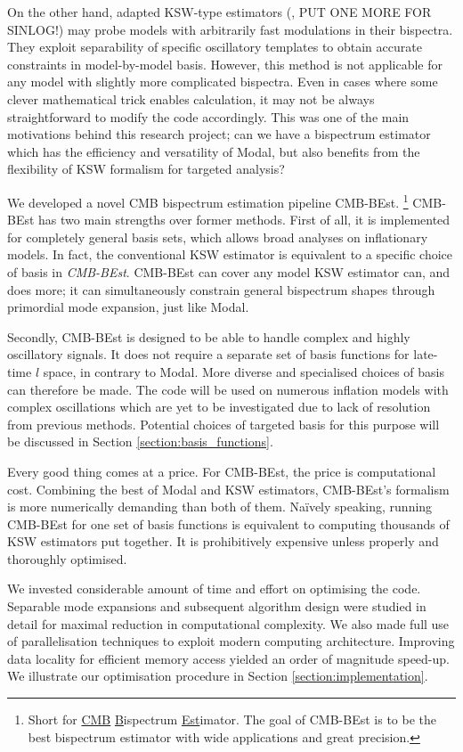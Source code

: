 On the other hand, adapted KSW-type estimators (\cite{Munchmeyer2014}, PUT ONE MORE FOR SINLOG!) may probe models with arbitrarily fast modulations in their bispectra. They exploit separability of specific oscillatory templates to obtain accurate constraints in model-by-model basis. However, this method is not applicable for any model with slightly more complicated bispectra. Even in cases where some clever mathematical trick enables calculation, it may not be always straightforward to modify the code accordingly. This was one of the main motivations behind this research project; can we have a bispectrum estimator which has the efficiency and versatility of Modal, but also benefits from the flexibility of KSW formalism for targeted analysis?

We developed a novel CMB bispectrum estimation pipeline CMB-BEst. \footnote{Short for \underline{CMB} \underline{B}ispectrum \underline{Est}imator. The goal of CMB-BEst is to be the best bispectrum estimator with wide applications and great precision.} CMB-BEst has two main strengths over former methods. First of all, it is implemented for completely general basis sets, which allows broad analyses on inflationary models. In fact, the conventional KSW estimator is equivalent to a specific choice of basis in \textit{CMB-BEst}. CMB-BEst can cover any model KSW estimator can, and does more; it can simultaneously constrain general bispectrum shapes through primordial mode expansion, just like Modal.

Secondly, CMB-BEst is designed to be able to handle complex and highly oscillatory signals. It does not require a separate set of basis functions for late-time $l$ space, in contrary to Modal. More diverse and specialised choices of basis can therefore be made. The code will be used on numerous inflation models with complex oscillations which are yet to be investigated due to lack of resolution from previous methods. Potential choices of targeted basis for this purpose will be discussed in Section \ref{section:basis_functions}.

Every good thing comes at a price. For CMB-BEst, the price is computational cost. Combining the best of Modal and KSW estimators, CMB-BEst's formalism is more numerically demanding than both of them. Na\"ively speaking, running CMB-BEst for one set of basis functions is equivalent to computing thousands of KSW estimators put together. It is prohibitively expensive unless properly and thoroughly optimised.

We invested considerable amount of time and effort on optimising the code. Separable mode expansions and subsequent algorithm design were studied in detail for maximal reduction in computational complexity. We also made full use of parallelisation techniques to exploit modern computing architecture. Improving data locality for efficient memory access yielded an order of magnitude speed-up. We illustrate our optimisation procedure in Section \ref{section:implementation}.

